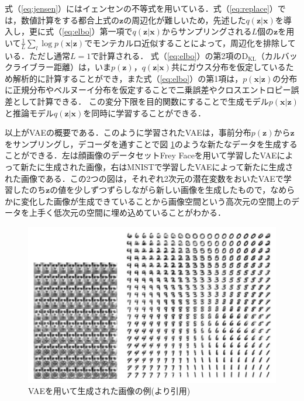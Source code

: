 式（\ref{eq:jensen}）にはイェンセンの不等式を用いている．式（\ref{eq:replace}）では，数値計算をする都合上式の$\bm{z}$の周辺化が難しいため，先述した$q(\bm{z}|\bm{x})$を導入し，更に式（\ref{eq:elbo}）第一項で$q(\bm{z}|\bm{x})$からサンプリングされる$L$個の$\bm{z}$を用いて$\frac{1}{L} \sum_{l} \log p(\bm{x}|\bm{z})$でモンテカルロ近似することによって，周辺化を排除している．ただし通常$L=1$で計算される．
式（\ref{eq:elbo}）の第2項の$\mathrm{D_{KL}}$（カルバックライブラー距離）は，いま$p(\bm{z})$，$q(\bm{z}|\bm{x})$共にガウス分布を仮定しているため解析的に計算することができ，また式（\ref{eq:elbo}）の第1項は，$p(\bm{x}|\bm{z})$の分布に正規分布やベルヌーイ分布を仮定することで二乗誤差やクロスエントロピー誤差として計算できる．
この変分下限を目的関数にすることで生成モデル$p(\bm{x}|\bm{z})$と推論モデル$q(\bm{z}|\bm{x})$を同時に学習することができる．

\vspace{\baselineskip}
以上がVAEの概要である．このように学習されたVAEは，事前分布$p(\bm{z})$から$\bm{z}$をサンプリングし，デコーダを通すことで図 \ref{fig:vae_example}のような新たなデータを生成することができる．左は顔画像のデータセットFrey Faceを用いて学習したVAEによって新たに生成された画像，右はMNISTで学習したVAEによって新たに生成された画像である．この2つの図は，それぞれ2次元の潜在変数をおいたVAEで学習したのち$\bm{z}$の値を少しずつずらしながら新しい画像を生成したもので，なめらかに変化した画像が生成できていることから画像空間という高次元の空間上のデータを上手く低次元の空間に埋め込めていることがわかる．

\begin{figure}[tbp]
  \begin{center}
    \includegraphics[width=\linewidth]{./figures/vae.png}
    \caption[VAEを用いて生成された画像の例]{VAEを用いて生成された画像の例(\cite{kingma2013autoencoding}より引用)}
    \label{fig:vae_example}
  \end{center}
\end{figure}

